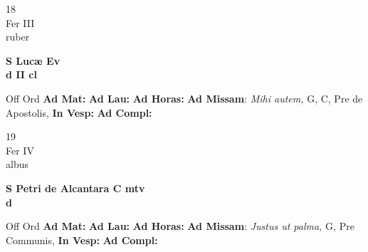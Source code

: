 \documentclass[10pt, openany]{book}
\begin{document}
        \begin{center}
            \begin{minipage}{3.5in}
                \vspace{2em}
                \begin{minipage}{0.5in}
                    {\Huge 18} \\
                    {\normalsize Fer III} \\
                    {\normalsize ruber}
                \end{minipage}
                \begin{minipage}{3.0in}
                    \textbf{ \large S Lucæ Ev \\
                    \textnormal{\normalsize d II cl}} \\ 
                \end{minipage}
                \begin{justify}Off Ord
                    \textbf{Ad Mat: }
                    \textbf{Ad Lau: }
                    \textbf{Ad Horas: }\textbf{Ad Missam}: \textit{Mihi autem,} G, C, Pre de Apostolis,  
                    \textbf{In Vesp: }
                    \textbf{Ad Compl: }
                \end{justify}
            \end{minipage}
        \end{center}
    
        \begin{center}
            \begin{minipage}{3.5in}
                \vspace{2em}
                \begin{minipage}{0.5in}
                    {\Huge 19} \\
                    {\normalsize Fer IV} \\
                    {\normalsize albus}
                \end{minipage}
                \begin{minipage}{3.0in}
                    \textbf{ \large S Petri de Alcantara C mtv \\
                    \textnormal{\normalsize d}} \\ 
                \end{minipage}
                \begin{justify}Off Ord
                    \textbf{Ad Mat: }
                    \textbf{Ad Lau: }
                    \textbf{Ad Horas: }\textbf{Ad Missam}: \textit{Justus ut palma,} G, Pre Communis,  
                    \textbf{In Vesp: }
                    \textbf{Ad Compl: }
                \end{justify}
            \end{minipage}
        \end{center}
    
\end{document}
